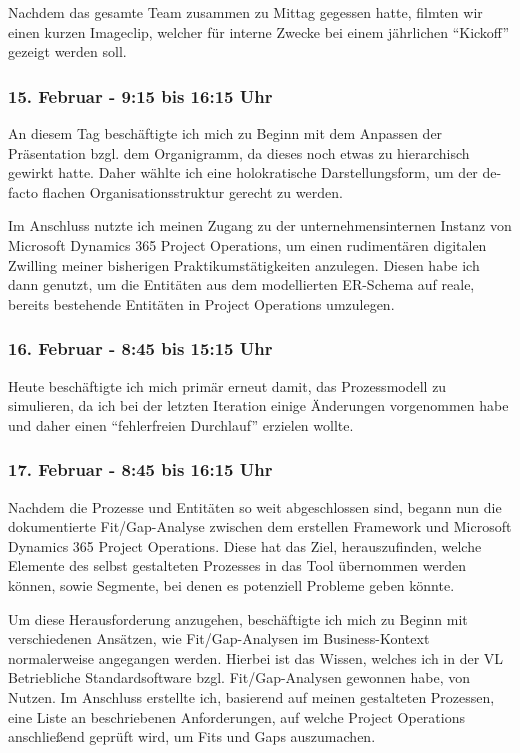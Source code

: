 Nachdem das gesamte Team zusammen zu Mittag gegessen hatte, filmten wir einen kurzen Imageclip, welcher für interne Zwecke bei einem jährlichen \enquote{Kickoff} gezeigt werden soll.

\subsubsection*{15. Februar - 9:15 bis 16:15 Uhr}
An diesem Tag beschäftigte ich mich zu Beginn mit dem Anpassen der Präsentation bzgl. dem Organigramm, da dieses noch etwas zu hierarchisch gewirkt hatte. Daher wählte ich eine holokratische Darstellungsform, um der de-facto flachen Organisationsstruktur gerecht zu werden. 

Im Anschluss nutzte ich meinen Zugang zu der unternehmensinternen Instanz von Microsoft Dynamics 365 Project Operations, um einen rudimentären digitalen Zwilling meiner bisherigen Praktikumstätigkeiten anzulegen. Diesen habe ich dann genutzt, um die Entitäten aus dem modellierten ER-Schema auf reale, bereits bestehende Entitäten in Project Operations umzulegen.

\subsubsection*{16. Februar - 8:45 bis 15:15 Uhr}
Heute beschäftigte ich mich primär erneut damit, das Prozessmodell zu simulieren, da ich bei der letzten Iteration einige Änderungen vorgenommen habe und daher einen \enquote{fehlerfreien Durchlauf} erzielen wollte.

\subsubsection*{17. Februar - 8:45 bis 16:15 Uhr}
Nachdem die Prozesse und Entitäten so weit abgeschlossen sind, begann nun die dokumentierte Fit/Gap-Analyse zwischen dem erstellen Framework und Microsoft Dynamics 365 Project Operations. Diese hat das Ziel, herauszufinden, welche Elemente des selbst gestalteten Prozesses in das Tool übernommen werden können, sowie Segmente, bei denen es potenziell Probleme geben könnte.

Um diese Herausforderung anzugehen, beschäftigte ich mich zu Beginn mit verschiedenen Ansätzen, wie Fit/Gap-Analysen im Business-Kontext normalerweise angegangen werden. Hierbei ist das Wissen, welches ich in der VL Betriebliche Standardsoftware bzgl. Fit/Gap-Analysen gewonnen habe, von Nutzen. Im Anschluss erstellte ich, basierend auf meinen gestalteten Prozessen, eine Liste an beschriebenen Anforderungen, auf welche Project Operations anschließend geprüft wird, um Fits und Gaps auszumachen.

